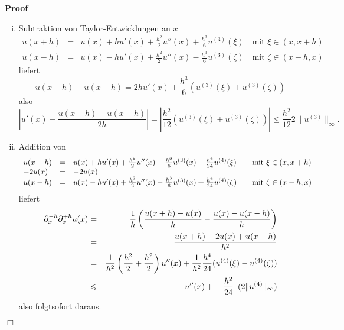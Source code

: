 \documentclass{book}
\newcommand{\tmtextit}[1]{\text{{\itshape{#1}}}}
\newenvironment{enumerateroman}{\begin{enumerate}[i.] }{\end{enumerate}}
\newenvironment{proof}{\noindent\textbf{Proof\ }}{\hspace*{\fill}$\Box$\medskip}
\begin{document}
\begin{proof}
\begin{enumerateroman}
    \item Subtraktion von Taylor-Entwicklungen an $x$
    \begin{eqnarray*}
      u (x + h) & = & u (x) + h u' (x) + \frac{h^2}{2} u'' (x) + \frac{h^3}{6}
      u^{(3)} (\xi) \quad \text{mit } \xi \in (x, x + h)\\
      u (x - h) & = & u (x) - h u' (x) + \frac{h^2}{2} u'' (x) - \frac{h^3}{6}
      u^{(3)} (\zeta) \quad \text{mit } \zeta \in (x - h, x)
    \end{eqnarray*}
    liefert
    \[ u (x + h) - u (x - h) = 2 h u' (x) + \frac{h^3}{6} (u^{(3)} (\xi) +
       u^{(3)} (\zeta)) \]
    also
    \[ \left| u' (x) - \frac{u (x + h) - u (x - h)}{2 h} \right| = \left|
       \frac{h^2}{12} (u^{(3)} (\xi) + u^{(3)} (\zeta)) \right| \leqslant
       \frac{h^2}{12} 2 \| u^{(3)} \|_{\infty} . \]
    \item Addition von
    \[ \begin{array}{llll}
         u (x + h) & = & u (x) + h u' (x) + \frac{h^2}{2} u'' (x) +
         \frac{h^3}{6} u^{(3)} (x) + \frac{h^4}{24} u^{(4)} (\xi) &
         \text{\quad mit } \xi \in (x, x + h)\\
         - 2 u (x) & = & - 2 u (x) & \\
         u (x - h) & = & u (x) - h u' (x) + \frac{h^2}{2} u'' (x) -
         \frac{h^3}{6} u^{(3)} (x) + \frac{h^4}{24} u^{(4)} (\zeta) &
         \text{\quad mit } \zeta \in (x - h, x)
       \end{array} \]
    liefert
    \begin{eqnarray*}
      \partial_x^{- h} \partial_x^{+ h} u (x) & = & \frac{1}{h} \left( \frac{u
      (x + h) - u (x)}{h} - \frac{u (x) - u (x - h)}{h} \right)\\
      & = & \frac{u (x + h) - 2 u (x) + u (x - h)}{h^2}\\
      & = & \frac{1}{h^2} \left( \frac{h^2}{2} + \frac{h^2}{2} \right) u''
      (x) + \frac{1}{h^2} \frac{h^4}{24} (u^{(4)} (\xi) - u^{(4)} (\zeta))\\
      & \leqslant & \text{{\hspace{6.5em}}} u'' (x) + \text{\quad}
      \frac{h^2}{24} \enspace (2 \| u^{(4)} \|_{\infty})
    \end{eqnarray*}
    also folgt\tmtextit{ iii. }sofort daraus. 
  \end{enumerateroman}
\end{proof}
\end{document}
